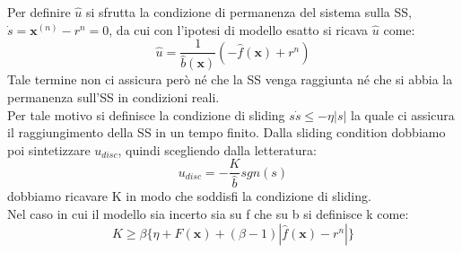 Per definire $\hat{u}$ si sfrutta la condizione di permanenza del sistema sulla SS, \\$\dot{s}=\boldsymbol {x}^{(n)}-r^n=0$, da cui con l'ipotesi di modello esatto si ricava $\hat{u}$ come:
\begin{equation}
\hat{u}=\frac{1}{\hat{b}(\boldsymbol {x})}(-\hat{f}(\boldsymbol {x})+r^n)
\end{equation}
Tale termine non ci assicura però né che la SS venga raggiunta né che si abbia la permanenza sull'SS in condizioni reali.\\
Per tale motivo si definisce la condizione di sliding $s\dot{s}\leq -\eta|s|$ la quale ci assicura il raggiungimento della SS in un tempo finito. Dalla sliding condition dobbiamo poi sintetizzare $u_{disc}$, quindi scegliendo dalla letteratura:
\begin{equation}
u_{disc}=-\frac{K}{\hat{b}}sgn(s)
\end{equation}
dobbiamo ricavare K in modo che soddisfi la condizione di sliding.
\\
Nel caso in cui il modello sia incerto sia su f che su b si definisce k come:
\begin{equation}
K\geq \beta \{\eta+F(\boldsymbol {x})+(\beta-1)|\hat{f}(\boldsymbol {x})-r^n|\}
\end{equation}
